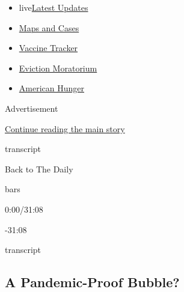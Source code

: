 \begin{itemize}
\tightlist
\item
  live\href{https://www.nytimes3xbfgragh.onion/2020/09/08/world/covid-19-coronavirus.html?name=styln-coronavirus-national\&region=TOP_BANNER\&block=storyline_menu_recirc\&action=click\&pgtype=Article\&impression_id=5999b781-f1f1-11ea-a350-cdd0ea8242e6\&variant=undefined}{Latest
  Updates}
\item
  \href{https://www.nytimes3xbfgragh.onion/interactive/2020/us/coronavirus-us-cases.html?name=styln-coronavirus-national\&region=TOP_BANNER\&block=storyline_menu_recirc\&action=click\&pgtype=Article\&impression_id=5999b782-f1f1-11ea-a350-cdd0ea8242e6\&variant=undefined}{Maps
  and Cases}
\item
  \href{https://www.nytimes3xbfgragh.onion/interactive/2020/science/coronavirus-vaccine-tracker.html?name=styln-coronavirus-national\&region=TOP_BANNER\&block=storyline_menu_recirc\&action=click\&pgtype=Article\&impression_id=5999de90-f1f1-11ea-a350-cdd0ea8242e6\&variant=undefined}{Vaccine
  Tracker}
\item
  \href{https://www.nytimes3xbfgragh.onion/2020/09/02/your-money/eviction-moratorium-covid.html?name=styln-coronavirus-national\&region=TOP_BANNER\&block=storyline_menu_recirc\&action=click\&pgtype=Article\&impression_id=5999de91-f1f1-11ea-a350-cdd0ea8242e6\&variant=undefined}{Eviction
  Moratorium}
\item
  \href{https://www.nytimes3xbfgragh.onion/interactive/2020/09/02/magazine/food-insecurity-hunger-us.html?name=styln-coronavirus-national\&region=TOP_BANNER\&block=storyline_menu_recirc\&action=click\&pgtype=Article\&impression_id=5999de92-f1f1-11ea-a350-cdd0ea8242e6\&variant=undefined}{American
  Hunger}
\end{itemize}

Advertisement

\protect\hyperlink{after-top}{Continue reading the main story}

transcript

Back to The Daily

bars

0:00/31:08

-31:08

transcript

\hypertarget{a-pandemic-proof-bubble}{%
\subsection{A Pandemic-Proof Bubble?}\label{a-pandemic-proof-bubble}}


